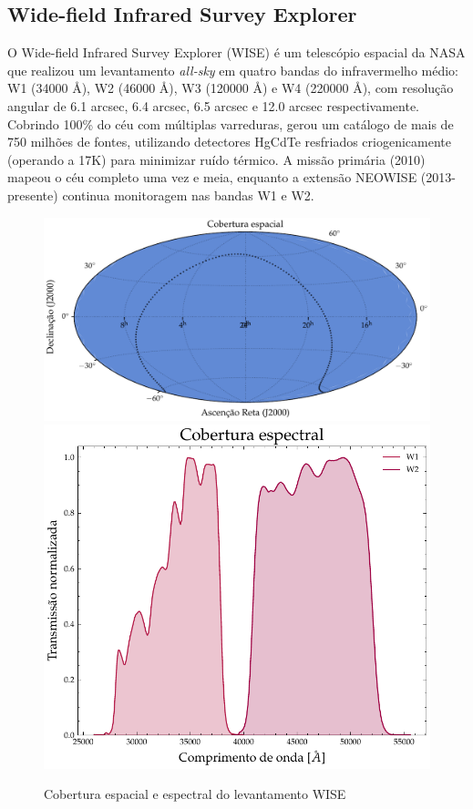 \subsection{Wide-field Infrared Survey Explorer}
\label{sec:unwise}

O Wide-field Infrared Survey Explorer (WISE) é um telescópio espacial da NASA que realizou um levantamento \emph{all-sky} em quatro bandas do infravermelho médio: W1 (34000 \AA), W2 (46000 \AA), W3 (120000 \AA) e W4 (220000 \AA), com resolução angular de 6.1 arcsec, 6.4 arcsec, 6.5 arcsec e 12.0 arcsec respectivamente. Cobrindo 100\% do céu com múltiplas varreduras, gerou um catálogo de mais de 750 milhões de fontes, utilizando detectores HgCdTe resfriados criogenicamente (operando a 17K) para minimizar ruído térmico. A missão primária (2010) mapeou o céu completo uma vez e meia, enquanto a extensão NEOWISE (2013-presente) continua monitoragem nas bandas W1 e W2.

\begin{figure}[!ht]
  \centering
  \caption{Cobertura espacial e espectral do levantamento WISE}
  \label{fig:footprint-unwise}
  \includegraphics[width=0.61\linewidth]{figures/footprint_unwise.pdf}\hfill
  \includegraphics[width=0.37\linewidth]{figures/transmission_unwise.pdf}
\end{figure}








